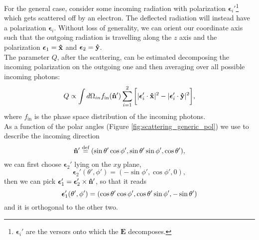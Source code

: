 For the general case, consider some incoming radiation with polarization $\boldsymbol{\epsilon}_i'$\footnote{$\boldsymbol{\epsilon}_i'$ are the versors onto which the $\mathbf{E}$ decomposes.} which gets scattered off by an electron. The deflected radiation will instead have a polarization $\boldsymbol{\epsilon}_i$. Without loss of generality, we can orient our coordinate axis such that the outgoing radiation is travelling along the $z$ axis and the polarization $\boldsymbol{\epsilon}_1=\mathbf{\hat{x}}$ and $\boldsymbol{\epsilon}_2=\mathbf{\hat{y}}$.\\
The parameter $Q$, after the scattering, can be estimated decomposing the incoming polarization on the outgoing one and then averaging over all possible incoming photons:
$$Q\propto\int d\Omega_{in} f_{\text{in}}(\mathbf{\hat{n}}')\sum_{i=1}^{2}\bigg[|\boldsymbol{\epsilon}_{i}'\cdot\mathbf{\hat{x}}|^2-|\boldsymbol{\epsilon}_{i}'\cdot\mathbf{\hat{y}}|^2\bigg],$$
where $f_{\text{in}}$ is the phase space distribution of the incoming photons.\\
As a function of the polar angles (Figure \ref{fig:scattering_generic_pol}) we use to describe the incoming direction $$\mathbf{\hat{n}}'\stackrel{\text{def}}{=}(\sin\theta'\cos\phi',\sin\theta'\sin\phi',\cos\theta'),$$ we can first choose $\boldsymbol{\epsilon}_2'$ lying on the $xy$ plane,
$$\boldsymbol{\epsilon}_2'(\theta',\phi') =(-\sin\phi',\cos\phi',0),$$ then we can pick $\boldsymbol{\epsilon}_1'=\boldsymbol{\epsilon}_2'\times\mathbf{\hat{n}}'$, so that it reads
$$
    \boldsymbol{\epsilon}_1'(\theta',\phi') =(\cos\theta'\cos\phi',\cos\theta'\sin\phi',-\sin\theta')\\
$$ 
and it is orthogonal to the other two.
